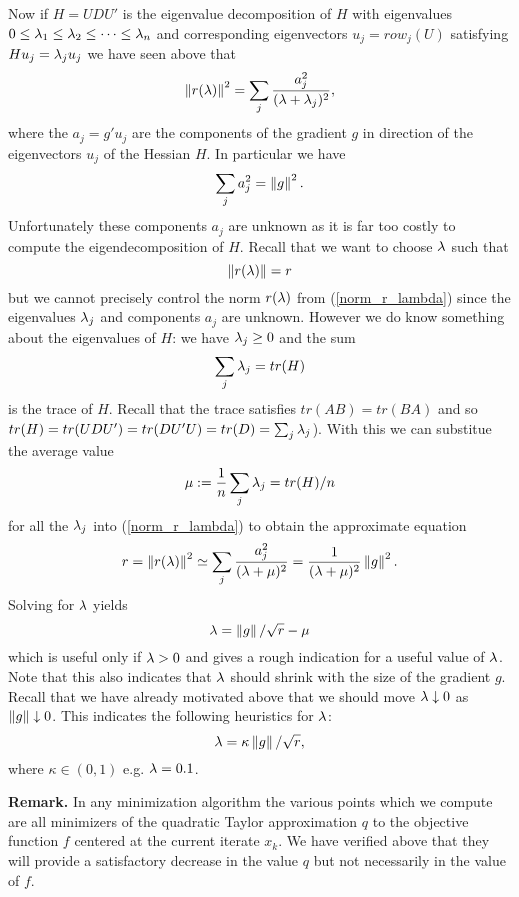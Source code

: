 Now if $H=UDU'$ is the eigenvalue decomposition of $H$ with eigenvalues 
$0\leq \lambda_1\leq\lambda_2\leq\dots\leq\lambda_n$ and corresponding eigenvectors
$u_j=row_j(U)$ satisfying $Hu_j=\lambda_ju_j$ we have seen above that
%
\begin{equation}
\label{norm_r_lambda}
\left\|r(\lambda)\right\|^2=\sum_j\frac{a_j^2}{(\lambda+\lambda_j)^2},
\end{equation}
%
where the $a_j=g'u_j$ are the components of the gradient $g$ in direction of
the eigenvectors $u_j$ of the Hessian $H$. In particular we have
$$
\sum_ja_j^2=\left\|g\right\|^2.
$$ 
Unfortunately these components $a_j$ are unknown as it
is far too costly to compute the eigendecomposition of $H$. Recall that we
want to choose $\lambda$ such that
%
\begin{equation}
\label{lambda_eq}
\left\|r(\lambda)\right\|=r
\end{equation}
% 
but we cannot precisely control the norm $r(\lambda)$ from (\ref{norm_r_lambda})
since the eigenvalues $\lambda_j$ and components $a_j$ are unknown. However we do 
know something about the eigenvalues of $H$: we have $\lambda_j\geq 0$ and the sum
$$
\sum_j\lambda_j = tr(H)
$$
is the trace of $H$. Recall that the trace satisfies $tr(AB)=tr(BA)$ and so 
$tr(H)=tr(UDU')=tr(DU'U)=tr(D)=\sum_j\lambda_j$). With this we can substitue the
average value 
$$
\mu:=\frac{1}{n}\sum_j\lambda_j=tr(H)/n
$$ 
for all the $\lambda_j$ into (\ref{norm_r_lambda}) to obtain the approximate
equation
%
\begin{equation}
\label{lambda_eq_1}
r=\left\|r(\lambda)\right\|^2\simeq\sum_j\frac{a_j^2}{(\lambda+\mu)^2}=
\frac{1}{(\lambda+\mu)^2}\left\|g\right\|^2.
\end{equation}
%
Solving for $\lambda$ yields 
%
\begin{equation}
\label{lambda_1}
\lambda=\left\|g\right\|/\sqrt r-\mu
\end{equation}
%
which is useful only if $\lambda>0$ and gives a rough indication for a useful value
of $\lambda$. Note that this also indicates that $\lambda$ should shrink with the size of
the gradient $g$. Recall that we have already motivated above that we should move 
$\lambda\downarrow 0$ as $\left\|g\right\|\downarrow 0$. This indicates the following heuristics 
for $\lambda$:
%
\begin{equation}
\label{lambda_2}
\lambda=\kappa\left\|g\right\|/\sqrt r,
\end{equation}
%
where $\kappa\in(0,1)$ e.g. $\lambda=0.1$.

\medskip\noindent
\textbf{Remark.}
In any minimization algorithm the various points which we compute are all minimizers of 
the quadratic Taylor approximation $q$ to the objective function $f$ centered at the current 
iterate $x_k$. We have verified above that they will provide a satisfactory decrease in the 
value $q$ but not necessarily in the value of $f$.

